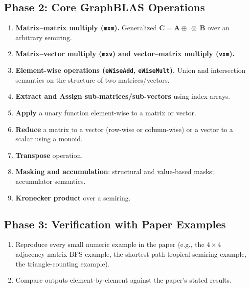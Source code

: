 \documentclass[11pt,a4paper]{article}
\begin{document}
\subsection{Phase 2: Core GraphBLAS Operations}
\begin{enumerate}[label=\textbf{2.\arabic*}]
  \item \textbf{Matrix--matrix multiply (\texttt{mxm}).} Generalized $\mathbf{C} = \mathbf{A} \oplus.\otimes\; \mathbf{B}$ over an arbitrary semiring.
  \item \textbf{Matrix--vector multiply (\texttt{mxv}) and vector--matrix multiply (\texttt{vxm}).}
  \item \textbf{Element-wise operations (\texttt{eWiseAdd}, \texttt{eWiseMult}).} Union and intersection semantics on the structure of two matrices/vectors.
  \item \textbf{Extract and Assign sub-matrices/sub-vectors} using index arrays.
  \item \textbf{Apply} a unary function element-wise to a matrix or vector.
  \item \textbf{Reduce} a matrix to a vector (row-wise or column-wise) or a vector to a scalar using a monoid.
  \item \textbf{Transpose} operation.
  \item \textbf{Masking and accumulation}: structural and value-based masks; accumulator semantics.
  \item \textbf{Kronecker product} over a semiring.
\end{enumerate}

\subsection{Phase 3: Verification with Paper Examples}
\begin{enumerate}[label=\textbf{3.\arabic*}]
  \item Reproduce every small numeric example in the paper (e.g., the $4\times 4$ adjacency-matrix BFS example, the shortest-path tropical semiring example, the triangle-counting example).
  \item Compare outputs element-by-element against the paper's stated results.
\end{enumerate}
\end{document}
